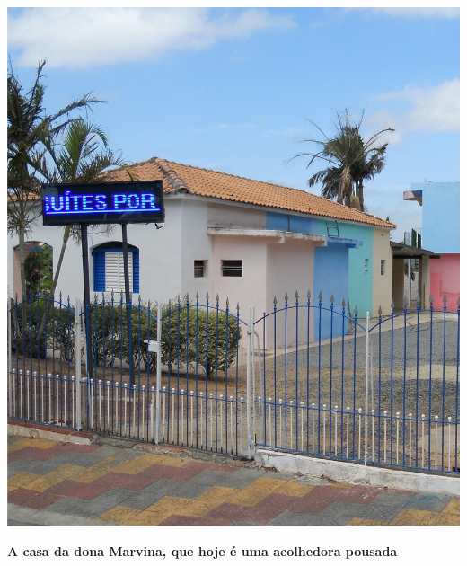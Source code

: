 \documentclass[12pt,brazil,]{book}
\begin{document}
\includegraphics{Imagens/pousada 28.01 metade.jpg}

\textbf{A casa da dona Marvina, que hoje é uma acolhedora pousada}
\end{document}
